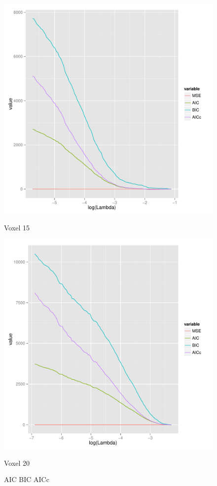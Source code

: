 \documentclass[english]{amsart}
\begin{document}
\begin{figure}[H]
  \includegraphics[width=\linewidth]{Voxel_15_AIC.pdf}
  \caption{Voxel 15}
\endminipage\hfill
\vspace{-5mm}
  \includegraphics[width=\linewidth]{Voxel_20_AIC.pdf}
  \caption{Voxel 20}
\endminipage
\caption{AIC BIC AICc}
\end{figure}
\vspace{-20mm}
\end{document}
